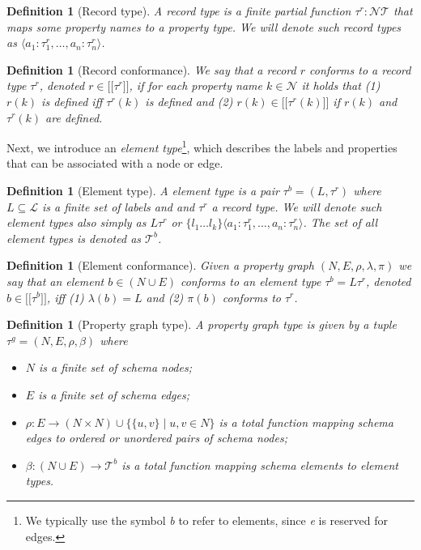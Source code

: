 \documentclass[a4paper]{article}
\makeatletter
\newtheorem{definition}[theorem]{Definition}
\newcommand{\ptypes}{\mathcal{T}}
\newcommand{\rtype}{\tau^r}
\newcommand{\btype}{\tau^b}
\newcommand{\btypes}{\mathcal{T}^b}
\newcommand{\gtype}{\tau^g}
\newcommand{\lsem}{\ensuremath{[\![}}
\newcommand{\rsem}{\ensuremath{]\!]}}
\newcommand{\sem}[1]{\ensuremath{\lsem #1 \rsem}}
\newcommand{\pto}{}%
\DeclareRobustCommand{\pto}{\mathrel{\mathpalette\p@to@gets\to}}
\newcommand{\p@to@gets}[2]{%
  \ooalign{\hidewidth$\m@th#1\mapstochar\mkern5mu$\hidewidth\cr$\m@th#1\to$\cr}%
}
\makeatother
\begin{document}
\begin{definition}[Record type]
  A \emph{record type} is a finite partial function $\rtype : \mathcal{N} \pto \ptypes$ that maps some property names to a property type. We will denote such record types as $\langle a_1 : \rtype_1, \ldots, a_n : \rtype_n \rangle$.
\end{definition}

\begin{definition}[Record conformance]
  We say that a record $r$ \emph{conforms} to a record type $\rtype$, denoted $r \in \sem{\rtype}$, if for each property name $k \in \mathcal{N}$ it holds that (1) $r(k)$ is defined iff $\rtype(k)$ is defined and (2) $r(k) \in \sem{\rtype(k)}$ if $r(k)$ and $\rtype(k)$ are defined.
\end{definition}

Next, we introduce an \emph{element type}\footnote{We typically use the symbol \emph{b} to refer to elements, since \emph{e} is reserved for edges.}, which describes the labels and properties that can be associated with a node or edge.

\begin{definition}[Element type]
  A \emph{element type} is a pair $\btype = (L, \rtype)$ where $L \subseteq \mathcal{L}$ is a finite set of labels and and $\rtype$ a record type. We will denote such element types also simply as $L\rtype$ or $\{ l_1 \ldots l_k \} \langle a_1 : \rtype_1, \ldots, a_n : \rtype_n \rangle$. The set of all element types is denoted as $\btypes$.
\end{definition}

\begin{definition}[Element conformance]
  Given a property graph $(N, E, \rho, \lambda, \pi)$ we say that an element $b \in (N \cup E)$ \emph{conforms} to an element type $\btype = L\rtype$, denoted $b \in \sem{\btype}$, iff (1) $\lambda(b) = L$ and (2) $\pi(b)$ conforms to $\rtype$.
\end{definition}

\begin{definition}[Property graph type]
  A \emph{property graph type} is given by a tuple $\gtype = (N, E, \rho, \beta)$ where 
  \begin{itemize}
    \item $N$ is a finite set of schema nodes;
    \item $E$ is a finite set of schema edges;
    \item $\rho : E \to (N \times N) \cup \{\{u, v\} \mid u, v \in N\}$ is a total function mapping schema edges to ordered or unordered pairs of schema nodes;
    \item $\beta : (N \cup E) \to \btypes$ is a total function mapping schema elements to element types.
  \end{itemize}
\end{definition}
\end{document}
